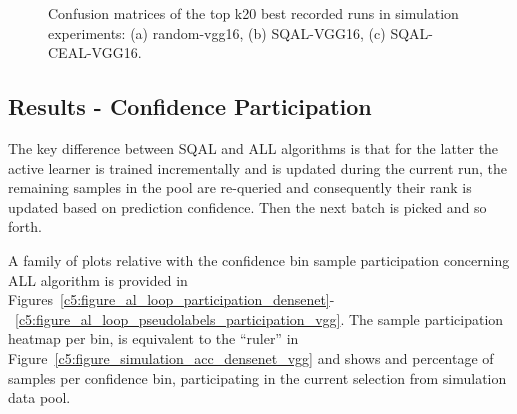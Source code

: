 \begin{figure}[ht!]
    \centering  
    \caption{Confusion matrices of the top k20 best recorded runs in simulation experiments: (a) random-vgg16, (b) SQAL-VGG16, (c) SQAL-CEAL-VGG16.}
    \label{c5:figure_cm_k20}
\end{figure}


\subsection{Results - Confidence Participation}

The key difference between SQAL and ALL algorithms is that for the latter the active learner is trained incrementally and is updated during the current run, the remaining samples in the pool are re-queried and consequently their rank is updated based on prediction confidence. Then the next batch is picked and so forth.

A family of plots relative with the confidence bin sample participation concerning ALL algorithm is provided in Figures~\ref{c5:figure_al_loop_participation_densenet}-~\ref{c5:figure_al_loop_pseudolabels_participation_vgg}. The sample participation heatmap per bin, is equivalent to the ``ruler'' in Figure~\ref{c5:figure_simulation_acc_densenet_vgg} and shows and percentage of samples per confidence bin, participating in the current selection from simulation data pool.

